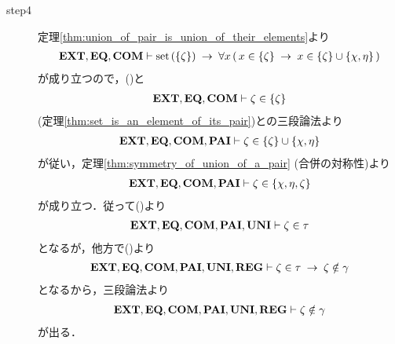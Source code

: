\begin{sketch}
\begin{description}
			\item[step4] 定理\ref{thm:union_of_pair_is_union_of_their_elements}より
				\begin{align}
					\mbox{{\bf EXT}},\mbox{{\bf EQ}},\mbox{\bf COM} \vdash 
					\operatorname*{set}\hspace{0.15em}(\{\zeta\}) \hspace{0.25em}\rightarrow\hspace{0.25em} \forall x\, (\, x \in \{\zeta\}
					\hspace{0.25em}\rightarrow\hspace{0.25em} x \in \{\zeta\} \cup \{\chi,\eta\}\, )
				\end{align}
				が成り立つので，()と
				\begin{align}
					\mbox{{\bf EXT}},\mbox{{\bf EQ}},\mbox{\bf COM} \vdash \zeta \in \{\zeta\}
				\end{align}
				(定理\ref{thm:set_is_an_element_of_its_pair})との三段論法より
				\begin{align}
					\mbox{{\bf EXT}},\mbox{{\bf EQ}},\mbox{\bf COM},\mbox{{\bf PAI}} \vdash 
					\zeta \in \{\zeta\} \cup \{\chi,\eta\}
				\end{align}
				が従い，定理\ref{thm:symmetry_of_union_of_a_pair} (合併の対称性)より
				\begin{align}
					\mbox{{\bf EXT}},\mbox{{\bf EQ}},\mbox{\bf COM},\mbox{{\bf PAI}} \vdash \zeta \in \{\chi,\eta,\zeta\}
				\end{align}
				が成り立つ．従って()より
				\begin{align}
					\mbox{{\bf EXT}},\mbox{{\bf EQ}},\mbox{\bf COM},\mbox{{\bf PAI}},\mbox{{\bf UNI}} \vdash \zeta \in \tau
					\label{fom:no_three_sets_go_round_20}
				\end{align}
				となるが，他方で()より
				\begin{align}
					\mbox{{\bf EXT}},\mbox{{\bf EQ}},\mbox{\bf COM},\mbox{{\bf PAI}},\mbox{{\bf UNI}},\mbox{{\bf REG}} \vdash 
					\zeta \in \tau \hspace{0.25em}\rightarrow\hspace{0.25em} \zeta \notin \gamma
				\end{align}
				となるから，三段論法より
				\begin{align}
					\mbox{{\bf EXT}},\mbox{{\bf EQ}},\mbox{\bf COM},\mbox{{\bf PAI}},\mbox{{\bf UNI}},\mbox{{\bf REG}} \vdash 
					\zeta \notin \gamma
					\label{fom:no_three_sets_go_round_21}
				\end{align}
				が出る．
				

\end{description}
\end{sketch}
